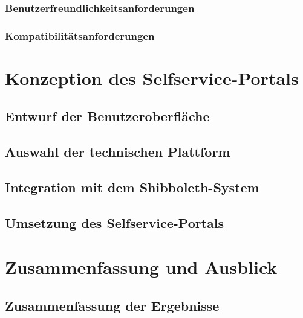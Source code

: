 \documentclass[11pt,a4paper]{scrartcl}
\begin{document}
      \subsubsection{Benutzerfreundlichkeitsanforderungen}\label{subsubsec:benutzerfreundlichkeit}
      \subsubsection{Kompatibilitätsanforderungen}\label{subsubsec:kompatibilitaet}

\section{Konzeption des Selfservice-Portals}\label{sec:konzeption}
   \subsection{Entwurf der Benutzeroberfläche}\label{subsec:entwurf}
   \subsection{Auswahl der technischen Plattform}\label{subsec:auswahl}
   \subsection{Integration mit dem Shibboleth-System}\label{subsec:integration}
   \subsection{Umsetzung des Selfservice-Portals}\label{subsec:umsetzung}

\section{Zusammenfassung und Ausblick}\label{sec:zusammenfassung}
   \subsection{Zusammenfassung der Ergebnisse}\label{subsec:zusammenfassung}


\newpage




\listoffigures
\end{document}
